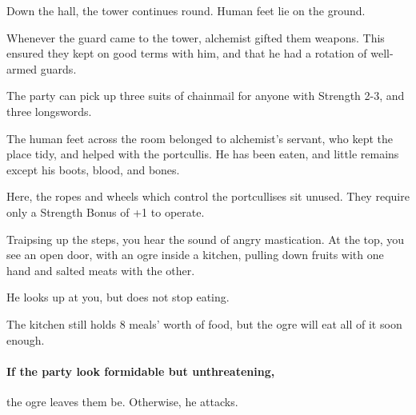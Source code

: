 \begin{multicols}{2}
\begin{boxtext}
  Down the hall, the tower continues round.
  Human feet lie on the ground.

\end{boxtext}



\begin{exampletext}
  Whenever the \gls{guard} came to the tower, \gls{alchemist} gifted them weapons.
  This ensured they kept on good terms with him, and that he had a rotation of well-armed guards.
\end{exampletext}


The party can pick up three suits of chainmail for anyone with Strength 2-3, and three longswords.

The human feet across the room belonged to \gls{alchemist}'s servant, who kept the place tidy, and helped with the portcullis.
He has been eaten, and little remains except his boots, blood, and bones.


Here, the ropes and wheels which control the portcullises sit unused.
They require only a Strength Bonus of +1 to operate.

\begin{boxtext}
  Traipsing up the steps, you hear the sound of angry mastication.
  At the top, you see an open door, with an ogre inside a kitchen, pulling down fruits with one hand and salted meats with the other.

  He looks up at you, but does not stop eating.
\end{boxtext}


The kitchen still holds 8 meals' worth of food, but the ogre will eat all of it soon enough.

\paragraph{If the party look formidable but unthreatening,}
the ogre leaves them be.
Otherwise, he attacks.


\end{multicols}
